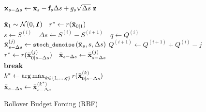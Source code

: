\begin{figure}[ht!]
\begin{minipage}{0.43\linewidth}
\begin{algorithm}[H]
{            $ \Bar{\mathbf{x}}_{s-\Delta s} \leftarrow \Bar{\mathbf{x}}_s - \mathbf{f}_s \Delta s + g_s\sqrt{\Delta s} \ \mathbf{z} $ 
            }
        \end{algorithm}
    \end{minipage}
    \hfill
    \begin{minipage}{0.53\linewidth}
        \centering
        \begin{algorithm}[H]
            \SetAlgoNoEnd
            \SetAlgoLined
            \DontPrintSemicolon
            \caption{Rollover Budget Forcing (RBF)}
            \label{alg:ours}
            {
            $\Bar{\mathbf{x}}_1\sim \mathcal{N}(0, \textbf{\textit{I}})\quad  r^* \leftarrow r(\Bar{\mathbf{x}}_{0|1})$\\
             {
                $s \leftarrow S^{(i)} \quad \Delta s \leftarrow S^{(i)} - S^{(i + 1)} \quad q \leftarrow Q^{(i)}$ \\
                 {
                    $ \Bar{\B{x}}_{s-\Delta s}^{(j)} \leftarrow \texttt{\footnotesize{stoch\_denoise}}\left(\Bar{\B{x}}_{s}, s, \Delta s \right)$ 
                     {
                        $ Q^{(i+1)} \leftarrow Q^{(i+1)} + Q^{(i)} - j$ 
                        $ r^{*} \leftarrow r(\Bar{\mathbf{x}}^{(j)}_{0|s-\Delta s}) \quad \Bar{\mathbf{x}}_{s-\Delta s} \leftarrow \Bar{\mathbf{x}}_{s-\Delta s}^{(j)} $ \\
                        \textbf{break} \\
                    }
                     {
                        $k^{*} \leftarrow \operatorname*{arg\,max}_{k\in \{1,\dots,q\}} r(\Bar{\mathbf{x}}^{(k)}_{0|s-\Delta s}) $ \\
                        $\Bar{\mathbf{x}}_{s-\Delta s} \leftarrow \Bar{\mathbf{x}}_{s-\Delta s}^{(k^{*})}$ \\ 
                    }
                }
            }
            }
        \end{algorithm}
    \end{minipage}
\end{figure}
